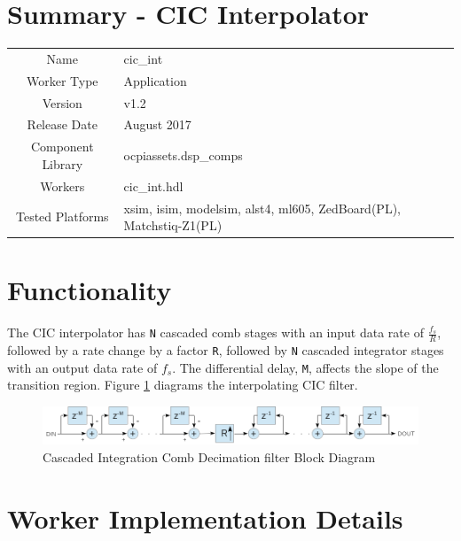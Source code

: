 \documentclass{article}
\author{} %
\date{Version \docVersion} %
\title{\docTitle}
\def\docVersion{1.2}
\def\comp{cic\_int}
\def\Comp{CIC Interpolator}
\begin{document}
\section*{Summary - \Comp}
\begin{tabular}{|c|M{13.5cm}|}
	\hline
	                  &                                                    \\
	\hline
	Name              & \comp                                              \\
	\hline
	Worker Type       & Application                                        \\
	\hline
	Version           & v\docVersion \\
	\hline
	Release Date      & August 2017 \\
	\hline
	Component Library & ocpiassets.dsp\_comps                              \\
	\hline
	Workers           & \comp.hdl                                          \\
	\hline
	Tested Platforms  & xsim, isim, modelsim, alst4, ml605, ZedBoard(PL), Matchstiq-Z1(PL) \\
	\hline
\end{tabular}

\section*{Functionality}
\begin{flushleft}
	The CIC interpolator has \verb+N+ cascaded comb stages with an input data rate of $\frac{f_{s}}{R}$, followed by a rate change by a factor \verb+R+, followed by \verb+N+ cascaded integrator stages with an output data rate of $f_{s}$. The differential delay, \verb+M+, affects the slope of the transition region. Figure \ref{fig:cic} diagrams the interpolating CIC filter.

	\begin{figure}[ht]
		\centering
		\includegraphics[scale=.6]{cic_interpolator_block_diagram}
		\caption{Cascaded Integration Comb Decimation filter Block Diagram}
		\label{fig:cic}
	\end{figure}
\end{flushleft}

\section*{Worker Implementation Details}
\end{document}
